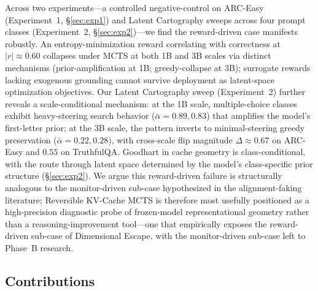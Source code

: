 \documentclass{article}
\begin{document}
Across two experiments---a controlled negative-control on ARC-Easy (Experiment~1, §\ref{sec:exp1}) and Latent Cartography sweeps across four prompt classes (Experiment~2, §\ref{sec:exp2})---we find the reward-driven case manifests robustly. An entropy-minimization reward correlating with correctness at $|r| \approx 0.60$ collapses under MCTS at both 1B and 3B scales via distinct mechanisms (prior-amplification at 1B; greedy-collapse at 3B); surrogate rewards lacking exogenous grounding cannot survive deployment as latent-space optimization objectives. Our Latent Cartography sweep (Experiment~2) further reveals a scale-conditional mechanism: at the 1B scale, multiple-choice classes exhibit heavy-steering search behavior ($\bar{\alpha} = 0.89, 0.83$) that amplifies the model's first-letter prior; at the 3B scale, the pattern inverts to minimal-steering greedy preservation ($\bar{\alpha} = 0.22, 0.28$), with cross-scale flip magnitude $\Delta \approx 0.67$ on ARC-Easy and $0.55$ on TruthfulQA. Goodhart in cache geometry is class-conditional, with the route through latent space determined by the model's class-specific prior structure (§\ref{sec:exp2}). We argue this reward-driven failure is structurally analogous to the monitor-driven sub-case hypothesized in the alignment-faking literature; Reversible KV-Cache MCTS is therefore most usefully positioned as a high-precision diagnostic probe of frozen-model representational geometry rather than a reasoning-improvement tool---one that empirically exposes the reward-driven sub-case of Dimensional Escape, with the monitor-driven sub-case left to Phase~B research.

\subsection{Contributions}
\end{document}
